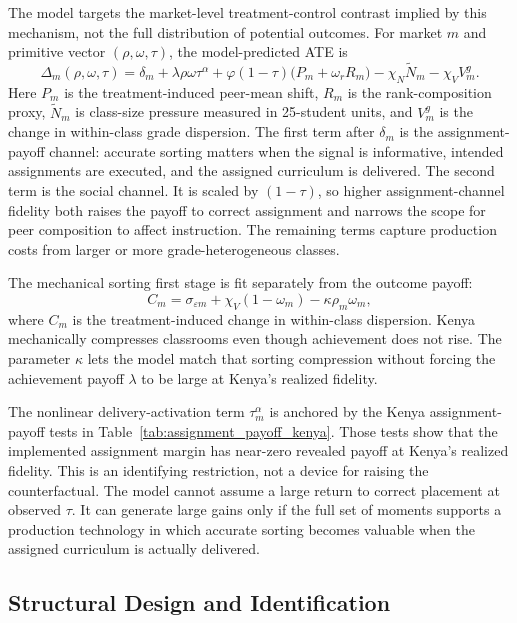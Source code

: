 \documentclass[11pt]{article}
\begin{document}
The model targets the market-level treatment-control contrast implied by this mechanism, not the full distribution of potential outcomes. For market $m$ and primitive vector $(\rho,\omega,\tau)$, the model-predicted ATE is
\begin{equation}
\label{eq:str_ate_map}
\Delta_m(\rho,\omega,\tau)
= \delta_m
+ \lambda \rho\omega\tau^\alpha
+ \varphi(1-\tau)\big(P_m+\omega_r R_m\big)
- \chi_N \widetilde{N}_m
- \chi_V V^g_m .
\end{equation}
Here $P_m$ is the treatment-induced peer-mean shift, $R_m$ is the rank-composition proxy, $\widetilde{N}_m$ is class-size pressure measured in 25-student units, and $V^g_m$ is the change in within-class grade dispersion. The first term after $\delta_m$ is the assignment-payoff channel: accurate sorting matters when the signal is informative, intended assignments are executed, and the assigned curriculum is delivered. The second term is the social channel. It is scaled by $(1-\tau)$, so higher assignment-channel fidelity both raises the payoff to correct assignment and narrows the scope for peer composition to affect instruction. The remaining terms capture production costs from larger or more grade-heterogeneous classes.

The mechanical sorting first stage is fit separately from the outcome payoff:
\begin{equation}
\label{eq:str_dispersion_map}
C_m = \sigma_{\varepsilon m} + \chi_V(1-\omega_m) - \kappa\rho_m\omega_m,
\end{equation}
where $C_m$ is the treatment-induced change in within-class dispersion. Kenya mechanically compresses classrooms even though achievement does not rise. The parameter $\kappa$ lets the model match that sorting compression without forcing the achievement payoff $\lambda$ to be large at Kenya's realized fidelity.

The nonlinear delivery-activation term $\tau_m^\alpha$ is anchored by the Kenya assignment-payoff tests in Table~\ref{tab:assignment_payoff_kenya}. Those tests show that the implemented assignment margin has near-zero revealed payoff at Kenya's realized fidelity. This is an identifying restriction, not a device for raising the counterfactual. The model cannot assume a large return to correct placement at observed $\tau$. It can generate large gains only if the full set of moments supports a production technology in which accurate sorting becomes valuable when the assigned curriculum is actually delivered.

\subsection{Structural Design and Identification}
\label{subsec:struct_blocks}
\end{document}
